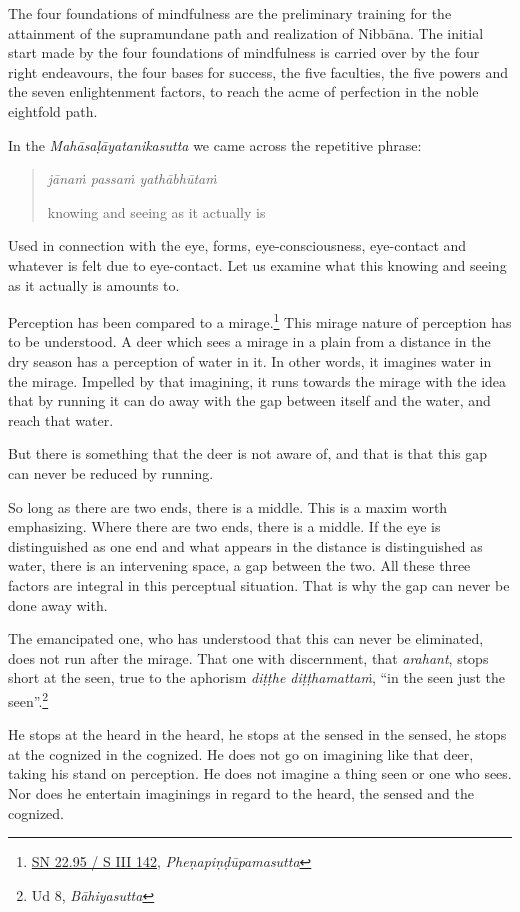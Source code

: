 The four foundations of mindfulness are the preliminary training for the attainment of the supramundane path and realization of Nibbāna. The initial start made by the four foundations of mindfulness is carried over by the four right endeavours, the four bases for success, the five faculties, the five powers and the seven enlightenment factors, to reach the acme of perfection in the noble eightfold path.

In the \emph{Mahāsaḷāyatanikasutta} we came across the repetitive phrase:

\begin{quote}
\emph{jānaṁ passaṁ yathābhūtaṁ}

knowing and seeing as it actually is
\end{quote}

Used in connection with the eye, forms, eye-consciousness, eye-contact and whatever is felt due to eye-contact. Let us examine what this knowing and seeing as it actually is amounts to.

Perception has been compared to a mirage.\footnote{\href{https://suttacentral.net/sn22.95/pli/ms}{SN 22.95 / S III 142}, \emph{Pheṇapiṇḍūpamasutta}} This mirage nature of perception has to be understood. A deer which sees a mirage in a plain from a distance in the dry season has a perception of water in it. In other words, it imagines water in the mirage. Impelled by that imagining, it runs towards the mirage with the idea that by running it can do away with the gap between itself and the water, and reach that water.

But there is something that the deer is not aware of, and that is that this gap can never be reduced by running.

So long as there are two ends, there is a middle. This is a maxim worth emphasizing. Where there are two ends, there is a middle. If the eye is distinguished as one end and what appears in the distance is distinguished as water, there is an intervening space, a gap between the two. All these three factors are integral in this perceptual situation. That is why the gap can never be done away with.

The emancipated one, who has understood that this can never be eliminated, does not run after the mirage. That one with discernment, that \emph{arahant}, stops short at the seen, true to the aphorism \emph{diṭṭhe diṭṭhamattaṁ}, ``in the seen just the seen''.\footnote{Ud 8, \emph{Bāhiyasutta}}

He stops at the heard in the heard, he stops at the sensed in the sensed, he stops at the cognized in the cognized. He does not go on imagining like that deer, taking his stand on perception. He does not imagine a thing seen or one who sees. Nor does he entertain imaginings in regard to the heard, the sensed and the cognized.

